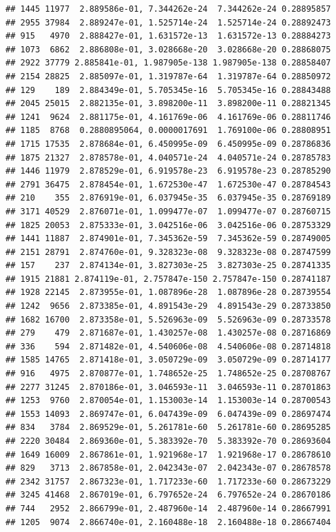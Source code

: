 \documentclass[
]{article}
\begin{document}
\begin{verbatim}
## 1445 11977  2.889586e-01, 7.344262e-24  7.344262e-24 0.28895857
## 2955 37984  2.889247e-01, 1.525714e-24  1.525714e-24 0.28892473
## 915   4970  2.888427e-01, 1.631572e-13  1.631572e-13 0.28884273
## 1073  6862  2.886808e-01, 3.028668e-20  3.028668e-20 0.28868075
## 2922 37779 2.885841e-01, 1.987905e-138 1.987905e-138 0.28858407
## 2154 28825  2.885097e-01, 1.319787e-64  1.319787e-64 0.28850972
## 129    189  2.884349e-01, 5.705345e-16  5.705345e-16 0.28843488
## 2045 25015  2.882135e-01, 3.898200e-11  3.898200e-11 0.28821345
## 1241  9624  2.881175e-01, 4.161769e-06  4.161769e-06 0.28811746
## 1185  8768  0.2880895064, 0.0000017691  1.769100e-06 0.28808951
## 1715 17535  2.878684e-01, 6.450995e-09  6.450995e-09 0.28786836
## 1875 21327  2.878578e-01, 4.040571e-24  4.040571e-24 0.28785783
## 1446 11979  2.878529e-01, 6.919578e-23  6.919578e-23 0.28785290
## 2791 36475  2.878454e-01, 1.672530e-47  1.672530e-47 0.28784543
## 210    355  2.876919e-01, 6.037945e-35  6.037945e-35 0.28769189
## 3171 40529  2.876071e-01, 1.099477e-07  1.099477e-07 0.28760715
## 1825 20053  2.875333e-01, 3.042516e-06  3.042516e-06 0.28753329
## 1441 11887  2.874901e-01, 7.345362e-59  7.345362e-59 0.28749005
## 2151 28791  2.874760e-01, 9.328323e-08  9.328323e-08 0.28747599
## 157    237  2.874134e-01, 3.827303e-25  3.827303e-25 0.28741335
## 1915 21881 2.874119e-01, 2.757847e-150 2.757847e-150 0.28741187
## 1928 22145  2.873955e-01, 1.087896e-28  1.087896e-28 0.28739554
## 1242  9656  2.873385e-01, 4.891543e-29  4.891543e-29 0.28733850
## 1682 16700  2.873358e-01, 5.526963e-09  5.526963e-09 0.28733578
## 279    479  2.871687e-01, 1.430257e-08  1.430257e-08 0.28716869
## 336    594  2.871482e-01, 4.540606e-08  4.540606e-08 0.28714818
## 1585 14765  2.871418e-01, 3.050729e-09  3.050729e-09 0.28714177
## 916   4975  2.870877e-01, 1.748652e-25  1.748652e-25 0.28708767
## 2277 31245  2.870186e-01, 3.046593e-11  3.046593e-11 0.28701863
## 1253  9760  2.870054e-01, 1.153003e-14  1.153003e-14 0.28700543
## 1553 14093  2.869747e-01, 6.047439e-09  6.047439e-09 0.28697474
## 834   3784  2.869529e-01, 5.261781e-60  5.261781e-60 0.28695285
## 2220 30484  2.869360e-01, 5.383392e-70  5.383392e-70 0.28693604
## 1649 16009  2.867861e-01, 1.921968e-17  1.921968e-17 0.28678610
## 829   3713  2.867858e-01, 2.042343e-07  2.042343e-07 0.28678578
## 2342 31757  2.867323e-01, 1.717233e-60  1.717233e-60 0.28673229
## 3245 41468  2.867019e-01, 6.797652e-24  6.797652e-24 0.28670186
## 744   2952  2.866799e-01, 2.487960e-14  2.487960e-14 0.28667991
## 1205  9074  2.866740e-01, 2.160488e-18  2.160488e-18 0.28667404

\end{verbatim}
\end{document}
